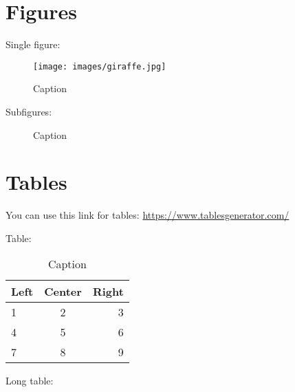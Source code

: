 \section{Figures}
Single figure:
\begin{figure}[H] %
    \centering
    \texttt{[image: images/giraffe.jpg]}
    \caption[]{Caption}
    \label{fig:label}
\end{figure}

Subfigures:
\begin{figure}[H] %
    \centering
     \hspace{0.1cm}
    \caption[]{Caption}
    \label{fig:label}
\end{figure}

\section{Tables}
You can use this link for tables: \url{https://www.tablesgenerator.com/}

Table:
\begin{table}[H]
\centering
{\begin{tabular}{|l|c|r|}
\hline
\textbf{Left} & \textbf{Center} & \textbf{Right} \\ \hline \hline
1 & 2 & 3 \\ \hline
4 & 5 & 6 \\ \hline
7 & 8 & 9 \\ \hline

\end{tabular}}
\caption{Caption}
\label{tab:label}
\end{table}


Long table:
\begin{table}[H]
\centering
{}
\caption{Caption}
\label{tab:label}
\end{table}

